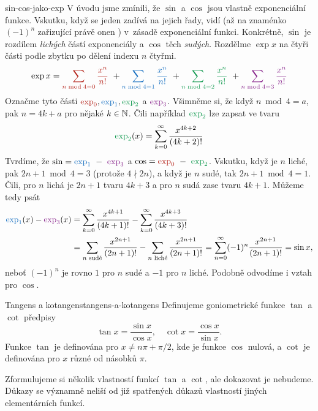 \begin{remark}{}{sin-cos-jako-exp}
 V úvodu jsme zmínili, že $\sin$ a $\cos$ jsou vlastně exponenciální funkce.
 Vskutku, když se jeden zadívá na jejich řady, vidí (až na znaménko $(-1)^{n}$
 zařizující právě onen ) v~zásadě exponenciální funkci.
 Konkrétně, $\sin$ je rozdílem \emph{lichých} částí exponenciály a $\cos$ těch
 \emph{sudých}. Rozdělme $\exp x$ na čtyři části podle zbytku po dělení indexu
 $n$ čtyřmi.
 \[
  \exp x = \clr{\sum_{n \bmod 4 = 0} \frac{x^{n}}{n!}}~+ \clb{\sum_{n \bmod 4 =
  1} \frac{x^{n}}{n!}}~+\clg{\sum_{n \bmod 4 = 2} \frac{x^{n}}{n!}}~+\clm{\sum_{n \bmod 4 =
  3} \frac{x^{n}}{n!}}
 \]
 Označme tyto části $\clr{\exp_0}, \clb{\exp_1}, \clg{\exp_2}$ a $\clm{\exp_3}$.
 Všimněme si, že když $n \bmod 4 = a$, pak $n = 4k + a$ pro nějaké $k \in \mathbb{N}$.
 Čili například $\clg{\exp_2}$ lze zapsat ve tvaru
 \[
  \clg{\exp_2}(x) = \sum_{k=0}^{\infty} \frac{x^{4k + 2}}{(4k + 2)!}
 \]
 Tvrdíme, že $\sin = \clb{\exp_1}~-~\clm{\exp_3}$ a $\cos = \clr{\exp_0}~-~
 \clg{\exp_2}$. Vskutku, když je $n$ liché, pak $2n+1 \bmod 4 = 3$ (protože $4
 \nmid 2n$), a když je $n$ sudé, tak $2n + 1 \bmod 4 = 1$. Čili, pro $n$ lichá
 je $2n + 1$ tvaru $4k+3$ a pro $n$ sudá zase tvaru $4k+1$. Můžeme tedy psát
 \begin{align*}
  \clb{\exp_1}(x) - \clm{\exp_3}(x) &= \sum_{k=0}^{\infty}
  \frac{x^{4k+1}}{(4k+1)!} - \sum_{k=0}^{\infty} \frac{x^{4k+3}}{(4k+3)!}\\
                                    &=\sum_{n \text{ sudé}}
                                    \frac{x^{2n+1}}{(2n+1)!} - \sum_{n \text{
                                    liché}} \frac{x^{2n+1}}{(2n+1)!} =
                                    \sum_{n=0}^{\infty}
                                    (-1)^{n}\frac{x^{2n+1}}{(2n+1)!} = \sin x,
 \end{align*}
 neboť $(-1)^{n}$ je rovno $1$ pro $n$ sudé a $-1$ pro $n$ liché. Podobně
 odvodíme i vztah pro $\cos$.
\end{remark}

\begin{definition}{Tangens a kotangens}{tangens-a-kotangens}
 Definujeme goniometrické funkce $\tan$ a $\cot$ předpisy
 \[
  \tan x = \frac{\sin x}{\cos x}, \quad \cot x = \frac{\cos x}{\sin x}.
 \]
 Funkce $\tan$ je definována pro $x \neq n\pi + \pi / 2$, kde je funkce
 $\cos$ nulová, a $\cot$ je definována pro $x$ různé od násobků $\pi$.
\end{definition}

Zformulujeme si několik vlastností funkcí $\tan$ a $\cot$, ale dokazovat je
nebudeme. Důkazy se významně neliší od již spatřených důkazů vlastností jiných
elementárních funkcí.

